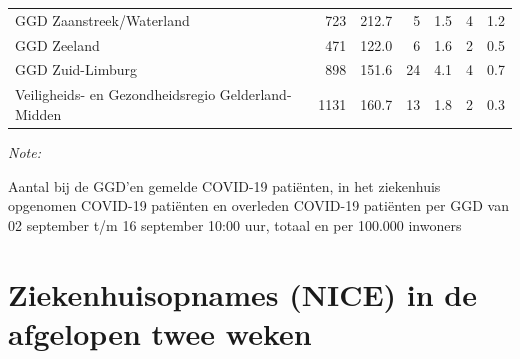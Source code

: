 \documentclass[
  english,
  man,floatsintext]{apa6}
\begin{document}
\begin{table}
\begin{threeparttable}
\begin{tabular}{lrrrrrr}
GGD Zaanstreek/Waterland & 723 & 212.7 & 5 & 1.5 & 4 & 1.2\\
GGD Zeeland & 471 & 122.0 & 6 & 1.6 & 2 & 0.5\\
GGD Zuid-Limburg & 898 & 151.6 & 24 & 4.1 & 4 & 0.7\\
Veiligheids- en Gezondheidsregio Gelderland-Midden & 1131 & 160.7 & 13 & 1.8 & 2 & 0.3\\
\bottomrule
\end{tabular}
\begin{tablenotes}
\item \textit{Note: } 
\item Aantal bij de GGD’en gemelde COVID-19 patiënten, in het ziekenhuis opgenomen COVID-19 patiënten en overleden COVID-19 patiënten per GGD van 02 september t/m 16 september 10:00 uur, totaal en per 100.000 inwoners
\end{tablenotes}
\end{threeparttable}
\endgroup{}
\end{table}

\newpage

\hypertarget{ziekenhuisopnames-nice-in-de-afgelopen-twee-weken}{%
\section{Ziekenhuisopnames (NICE) in de afgelopen twee weken}\label{ziekenhuisopnames-nice-in-de-afgelopen-twee-weken}}
\end{document}
